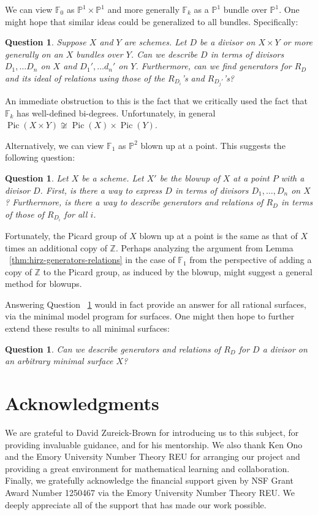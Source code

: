 \documentclass{amsart}
\theoremstyle{plain}
\newtheorem{question}[thm]{Question}
\theoremstyle{definition}
\theoremstyle{remark}
\numberwithin{equation}{section}
\newcommand\bp{{\mathbb P}}
\newcommand\bz{{\mathbb Z}}
\newcommand\hirz{\mathbb{F}}
\DeclareMathOperator{\Pic}{Pic}
\begin{document}
We can view $\hirz_0$ as $\bp^1\times \bp^1$ and more generally $\hirz_k$ as a
$\bp^1$ bundle over $\bp^1$.  One might hope that similar ideas could be
generalized to all bundles.  Specifically:
\begin{question}
\label{qn:general-product-bundle}
Suppose $X$ and $Y$ are schemes.  Let $D$ be a divisor on $X\times Y$ or more
generally on an $X$ bundles over $Y$.  Can we describe $D$ in terms of divisors
$D_1, \ldots D_n$ on $X$ and $D_1', \ldots d_n'$ on $Y$.  Furthermore, can we
find generators for $R_D$ and its ideal of relations using those of the
$R_{D_i}$'s and $R_{D_j'}$'s?
\end{question}

An immediate obstruction to this is the fact that we critically used the fact
that $\hirz_k$ has well-defined bi-degrees.  Unfortunately, in general $\Pic(X
\times Y) \not \cong \Pic(X) \times \Pic(Y)$.

Alternatively, we can view $\hirz_1$ as $\bp^2$ blown up at a point.  This
suggests the following question:
\begin{question}
\label{qn:general-blowup}
Let $X$ be a scheme.  Let $X'$ be the blowup of $X$ at a point $P$ with a
divisor $D$.  First, is there a way to express $D$ in terms of divisors $D_1,
\ldots, D_n$ on $X$?  Furthermore, is there a way to describe generators and
relations of $R_D$ in terms of those of $R_{D_i}$ for all $i$.
\end{question}

Fortunately, the Picard group of $X$ blown up at a point is the same as that of
$X$ times an additional copy of $\bz$.  Perhaps analyzing the argument from
Lemma ~\ref{thm:hirz-generators-relations} in the case of $\hirz_1$ from the
perspective of adding a copy of $\mathbb{Z}$ to the Picard group, as induced by
the blowup, might suggest a general method for blowups.

Answering Question ~\ref{qn:general-blowup} would in fact provide an answer for
all rational surfaces, via the minimal model program for surfaces.  One might then hope to further extend these results to all minimal surfaces:
\begin{question}
\label{qn:general-minimal-surface}
Can we describe generators and relations of $R_D$ for $D$ a divisor on an
arbitrary minimal surface $X$?
\end{question}


\section{Acknowledgments}
\label{sec:ack}
We are grateful to David Zureick-Brown for introducing us to this
subject, for providing invaluable guidance,
and for his mentorship. We also thank Ken Ono and the
Emory University Number Theory REU for arranging our project and
providing a great environment for mathematical learning and
collaboration.
Finally, we gratefully acknowledge the financial support given by
NSF Grant Award Number 1250467 via the Emory University Number
Theory REU. We deeply appreciate all of the support that has made
our work possible.


\nocite{*}
{}

\end{document}

